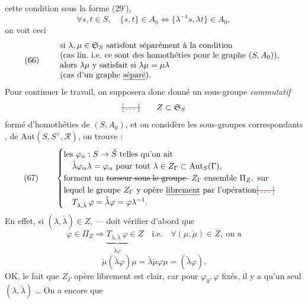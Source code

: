 \documentclass[11pt,a4paper]{article}
\begin{document}
cette condition sous la forme (29'),
\[
\forall s, t \in S,\quad \{s, t\} \in A_0 \Longleftrightarrow \{\lambda^{-1} s, \lambda t\} \in A_0 ,
\]
on voit ceci
\[
(66)\qquad
\begin{array}{l}
\text{si } \lambda, \mu \in \mathfrak{S}_S \text{ satisfont séparément à la condition} \\
\text{(cas lin.\ i.e.\ ce sont des homothéties pour le graphe } (S, A_0)\text{),} \\
\text{alors } \lambda\mu \text{ y satisfait si } \lambda\mu = \mu\lambda \\
\text{(cas d'un graphe \emph{séparé}).}
\end{array}
\]
Pour continuer le travail, on supposera donc donné un sous-groupe
\emph{commutatif}
\[
\text{\struck{\ill{}}}\qquad Z \subset \mathfrak{S}_S
\]
formé d'homothéties de $(S, A_0)$, et on considère 
 les sous-groupes correspondants
, de
$\mathrm{Aut}(S, S^{\vee}, \mathcal{R})$, on trouve : 
\[
(67)\qquad
\begin{cases}
\text{les } \varphi_\alpha : S \to \check{S} \text{ telles qu'on ait} \\
\quad \check{\lambda} \varphi_\alpha \lambda = \varphi_\alpha \text{ pour tout } \lambda \in Z_{\Gamma} \subset \mathrm{Aut}_S(\Gamma), \\
\text{forment un } \text{\struck{torseur sous le groupe } $Z_{\Gamma}$}\ \text{ensemble } \Pi_Z, \text{ sur} \\
\text{lequel le groupe } Z_{\Gamma} \text{ y opère \emph{librement} par l'opération} \text{\struck{\ill{}}} \\
\quad T_{\lambda, \check{\lambda}}\, \varphi = \check{\lambda} \varphi = \varphi \lambda^{-1} .
\end{cases}
\]
En effet,  si $(\lambda, \check{\lambda}) \in Z$, — doit vérifier
d'abord que
\[
\varphi \in \Pi_Z \Longrightarrow \underbrace{T_{\lambda, \check{\lambda}}\, \varphi}_{\check{\lambda}\varphi} \in Z \quad \text{i.e.} \quad
\forall (\mu, \check{\mu}) \in Z,\ \text{on a}
\]
\[
\check{\mu}(\check{\lambda} \varphi) \mu = \check{\lambda} \check{\mu} \varphi \mu = (\check{\lambda} \varphi) .
\]
OK, le fait que $Z_{\Gamma}$ opère librement est clair, \struck{\ill{}} car
pour $\varphi_0, \varphi$ fixés, il y a qu'un seul $(\lambda, \check{\lambda})$ …
On a encore que
\end{document}
